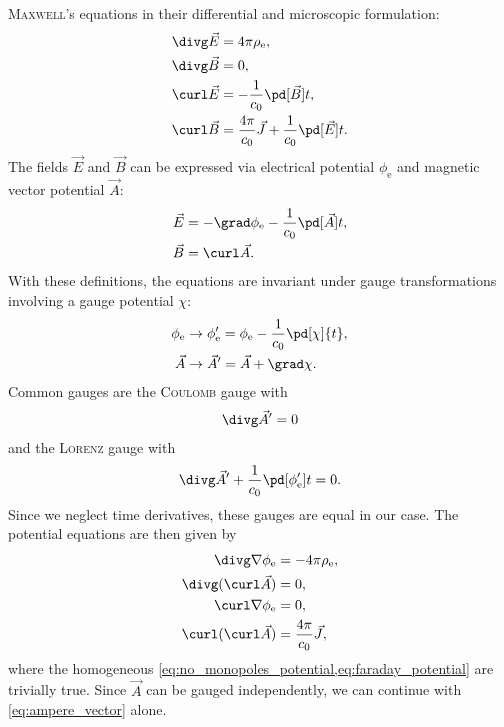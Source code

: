 \textsc{Maxwell}'s equations in their differential and microscopic formulation:
\begin{align}
  \divg \vec{E} &= 4 \pi \rho_{\text{e}}, \label{eq:gauss_field} \\
  \divg \vec{B} &= 0, \label{eq:no_monopoles_field} \\
  \curl \vec{E} &= -\frac{1}{c_{0}} \pd[\vec{B}]{t}, \label{eq:faraday_field} \\
  \curl \vec{B} &= \frac{4 \pi}{c_{0}} \vec{J} + \frac{1}{c_{0}} \pd[\vec{E}]{t}. \label{eq:ampere_field}
\end{align}
The fields $\vec{E}$ and $\vec{B}$ can be expressed via electrical potential $\phi_{\text{e}}$ and magnetic vector potential $\vec{A}$:
\begin{align}
  \vec{E} &= -\grad \phi_{\text{e}} - \frac{1}{c_{0}} \pd[\vec{A}]{t}, \label{eq:electric_field} \\
  \vec{B} &= \curl \vec{A}. \label{eq:magnetic_field}
\end{align}
With these definitions, the equations are invariant under gauge transformations involving a gauge potential $\chi$:
\begin{align*}
  \phi_{\text{e}} &\to \phi_{\text{e}}' = \phi_{\text{e}} - \frac{1}{c_{0}} \pd[\chi]{t}, \\
  \vec{A} &\to \vec{A}' = \vec{A} + \grad \chi.
\end{align*}
Common gauges are the \textsc{Coulomb} gauge with
\begin{gather*}
  \divg \vec{A}' = 0
\end{gather*}
and the \textsc{Lorenz} gauge with
\begin{gather*}
  \divg \vec{A}' + \frac{1}{c_{0}} \pd[\phi_{\text{e}}']{t} = 0.
\end{gather*}
Since we neglect time derivatives, these gauges are equal in our case. The potential equations are then given by
\begin{align}
  \divg \nabla \phi_{\text{e}} &= -4 \pi \rho_{\text{e}}, \label{eq:gauss_potential} \\
  \divg (\curl \vec{A}) &= 0, \label{eq:no_monopoles_potential} \\
  \curl \nabla \phi_{\text{e}} &= 0, \label{eq:faraday_potential} \\
  \curl (\curl \vec{A}) &= \frac{4 \pi}{c_{0}} \vec{J}, \label{eq:ampere_vector}
\end{align}
where the homogeneous \cref{eq:no_monopoles_potential,eq:faraday_potential} are trivially true. Since $\vec{A}$ can be gauged independently, we can continue with \cref{eq:ampere_vector} alone.


